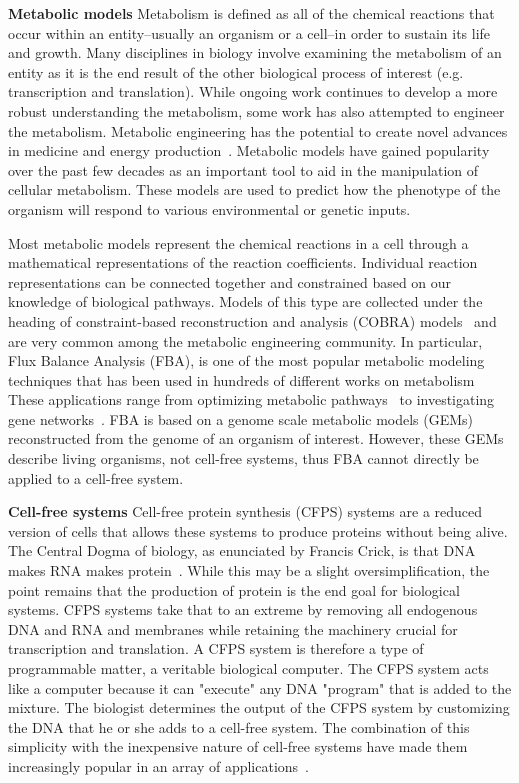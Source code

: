 \textbf{Metabolic models}
Metabolism is defined as all of the chemical reactions that occur within an entity--usually an organism or a cell--in order to sustain its life and growth.
Many disciplines in biology involve examining the metabolism of an entity as it is the end result of the other biological process of interest (e.g. transcription and translation).
While ongoing work continues to develop a more robust understanding the metabolism, some work has also attempted to engineer the metabolism. 
Metabolic engineering has the potential to create novel advances in medicine and energy production~\cite{keasling2012synthetic}.
Metabolic models have gained popularity over the past few decades as an important tool to aid in the manipulation of cellular metabolism.
These models are used to predict how the phenotype of the organism will respond to various environmental or genetic inputs.

Most metabolic models represent the chemical reactions in a cell through a mathematical representations of the reaction coefficients.
Individual reaction representations can be connected together and constrained based on our knowledge of biological pathways.
Models of this type are collected under the heading of constraint-based reconstruction and analysis (COBRA) models~\cite{schellenberger2011quantitative} and are very common among the metabolic engineering community.
In particular, Flux Balance Analysis (FBA), is one of the most popular metabolic modeling techniques that has been used in hundreds of different works on metabolism~\cite{feist2008growing}
These applications range from optimizing metabolic pathways~\cite{almaas2004global} to investigating gene networks~\cite{shlomi2007genome}.
FBA is based on a genome scale metabolic models (GEMs) reconstructed from the genome of an organism of interest.
However, these GEMs describe living organisms, not cell-free systems, thus FBA cannot directly be applied to a cell-free system.

\textbf{Cell-free systems}
Cell-free protein synthesis (CFPS) systems are a reduced version of cells that allows these systems to produce proteins without being alive.
The Central Dogma of biology, as enunciated by Francis Crick, is that DNA makes RNA makes protein~\cite{crick1970central}.
While this may be a slight oversimplification, the point remains that the production of protein is the end goal for biological systems.
CFPS systems take that to an extreme by removing all endogenous DNA and RNA and membranes while retaining the machinery crucial for transcription and translation.
A CFPS system is therefore a type of programmable matter, a veritable biological computer.
The CFPS system acts like a computer because it can "execute" any DNA "program" that is added to the mixture.
The biologist determines the output of the CFPS system by customizing the DNA that he or she adds to a cell-free system.
The combination of this simplicity with the inexpensive nature of cell-free systems have made them increasingly popular in an array of applications~\cite{}.

